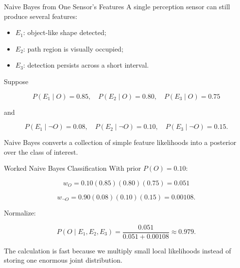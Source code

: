 \documentclass[aspectratio=169,10pt]{beamer}
\begin{document}
\begin{frame}[shrink=10]{Naive Bayes from One Sensor's Features}
  A single perception sensor can still produce several features:

  \begin{itemize}
    \item $E_1$: object-like shape detected;
    \item $E_2$: path region is visually occupied;
    \item $E_3$: detection persists across a short interval.
  \end{itemize}

  Suppose

  \[
    P(E_1\mid O)=0.85,\quad P(E_2\mid O)=0.80,\quad P(E_3\mid O)=0.75
  \]

  and

  \[
    P(E_1\mid \neg O)=0.08,\quad P(E_2\mid \neg O)=0.10,\quad P(E_3\mid \neg O)=0.15.
  \]

  \begin{keyidea}
    Naive Bayes converts a collection of simple feature likelihoods into a posterior over the class of interest.
  \end{keyidea}
\end{frame}

\begin{frame}[shrink=10]{Worked Naive Bayes Classification}
  With prior $P(O)=0.10$:

  \[
    w_O=0.10(0.85)(0.80)(0.75)=0.051
  \]

  \[
    w_{\neg O}=0.90(0.08)(0.10)(0.15)=0.00108.
  \]

  Normalize:

  \[
    P(O\mid E_1,E_2,E_3)
    =\frac{0.051}{0.051+0.00108}
    \approx \boxed{0.979}.
  \]

  \begin{keyidea}
    The calculation is fast because we multiply small local likelihoods instead of storing one enormous joint distribution.
  \end{keyidea}
\end{frame}
\end{document}
